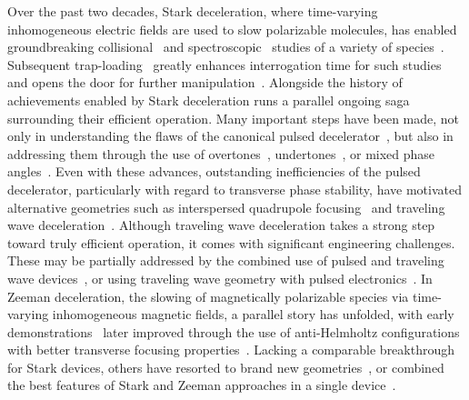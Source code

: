 \documentclass[%
 reprint,
 amsmath,amssymb,
 aps,
prl,
]{revtex4-1}
\begin{document}
\maketitle


Over the past two decades, Stark deceleration, where time-varying inhomogeneous electric fields are used to slow polarizable molecules, has enabled groundbreaking collisional~\cite{Sawyer2011,Kirste2012,Gao2018} and spectroscopic~\cite{Veldhoven2004,Hudson2006,Lev2006,Fast2018} studies of a variety of species~\cite{VanDeMeerakker2012}. 
Subsequent trap-loading~\cite{Bethlem2002,Sawyer2007} greatly enhances interrogation time for such studies~\cite{Sawyer2008} and opens the door for further manipulation~\cite{Reens2017}. 
Alongside the history of achievements enabled by Stark deceleration runs a parallel ongoing saga surrounding their efficient operation. 
Many important steps have been made, not only in understanding the flaws of the canonical pulsed decelerator~\cite{VanDeMeerakker2006,Sawyer2008a}, but also in addressing them through the use of overtones~\cite{VanDeMeerakker2005a,Scharfenberg2009}, undertones~\cite{Zhang2016}, or mixed phase angles~\cite{Parazzoli2009,Hou2013}. 
Even with these advances, outstanding inefficiencies of the pulsed decelerator, particularly with regard to transverse phase stability, have motivated alternative geometries such as interspersed quadrupole focusing~\cite{Sawyer2008a} and traveling wave deceleration~\cite{Osterwalder2010,VandenBerg2014,Fabrikant2014}.
Although traveling wave deceleration takes a strong step toward truly efficient operation, it comes with significant engineering challenges. 
These may be partially addressed by the combined use of pulsed and traveling wave devices~\cite{Quintero-Perez2013}, or using traveling wave geometry with pulsed electronics~\cite{Hou2016,Shyur2017}. 
In Zeeman deceleration, the slowing of magnetically polarizable species via time-varying inhomogeneous magnetic fields, a parallel story has unfolded, with early demonstrations~\cite{Vanhaecke2007,Narevicius2008} later improved through the use of anti-Helmholtz configurations with better transverse focusing properties~\cite{LavertOfir2011,Dulitz2014}.
Lacking a comparable breakthrough for Stark devices, others have resorted to brand new geometries~\cite{Wang2016}, or combined the best features of Stark and Zeeman approaches in a single device~\cite{Cremers2017,Plomp2019}.
\end{document}
